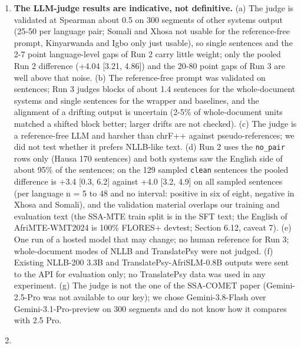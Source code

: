 \begin{enumerate}
\item
  \textbf{The LLM-judge results are indicative, not definitive.} (a) The judge is validated at Spearman about 0.5 on 300 segments of other systems\textquotesingle{} output (25-50 per language pair; Somali and Xhosa not usable for the reference-free prompt, Kinyarwanda and Igbo only just usable), so single sentences and the 2-7 point language-level gaps of Run 2 carry little weight; only the pooled Run 2 difference (+4.04 {[}3.21, 4.86{]}) and the 20-80 point gaps of Run 3 are well above that noise. (b) The reference-free prompt was validated on sentences; Run 3 judges blocks of about 1.4 sentences for the whole-document systems and single sentences for the wrapper and baselines, and the alignment of a drifting output is uncertain (2-5\% of whole-document units matched a shifted block better; larger drifts are not checked). (c) The judge is a reference-free LLM and harsher than chrF++ against pseudo-references; we did not test whether it prefers NLLB-like text. (d) Run 2 uses the \texttt{no\_pair} rows only (Hausa 170 sentences) and both systems saw the English side of about 95\% of the sentences; on the 129 sampled \texttt{clean} sentences the pooled difference is +3.4 {[}0.3, 6.2{]} against +4.0 {[}3.2, 4.9{]} on all sampled sentences (per language n = 5 to 48 and no interval: positive in six of eight, negative in Xhosa and Somali), and the validation material overlaps our training and evaluation text (the SSA-MTE train split is in the SFT text; the English of AfriMTE-WMT2024 is 100\% FLORES+ devtest; Section 6.12, caveat 7). (e) One run of a hosted model that may change; no human reference for Run 3; whole-document modes of NLLB and TranslatePsy were not judged. (f) Existing NLLB-200 3.3B and TranslatePsy-AfriSLM-0.8B outputs were sent to the API for evaluation only; no TranslatePsy data was used in any experiment. (g) The judge is not the one of the SSA-COMET paper (Gemini-2.5-Pro was not available to our key); we chose Gemini-3.8-Flash over Gemini-3.1-Pro-preview on 300 segments and do not know how it compares with 2.5 Pro.
\item

\end{enumerate}
